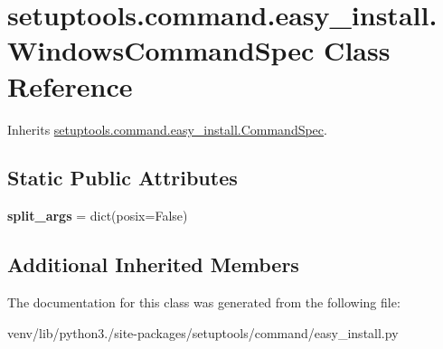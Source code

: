 \hypertarget{classsetuptools_1_1command_1_1easy__install_1_1_windows_command_spec}{}\section{setuptools.\+command.\+easy\+\_\+install.\+Windows\+Command\+Spec Class Reference}
\label{classsetuptools_1_1command_1_1easy__install_1_1_windows_command_spec}


Inherits \hyperlink{classsetuptools_1_1command_1_1easy__install_1_1_command_spec}{setuptools.\+command.\+easy\+\_\+install.\+Command\+Spec}.

\subsection*{Static Public Attributes}
\begin{DoxyCompactItemize}
\item 
\mbox{\label{classsetuptools_1_1command_1_1easy__install_1_1_windows_command_spec_ad1474352e395359b1f389a0afbbb6dce}} 
{\bfseries split\+\_\+args} = dict(posix=False)
\end{DoxyCompactItemize}
\subsection*{Additional Inherited Members}


The documentation for this class was generated from the following file\+:\begin{DoxyCompactItemize}
\item 
venv/lib/python3./site-\/packages/setuptools/command/easy\+\_\+install.\+py\end{DoxyCompactItemize}
